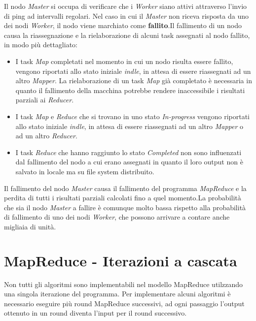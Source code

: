\documentclass[LaM,binding=0.6cm]{sapthesis}
\begin{document}
Il nodo \textit{Master} si occupa di verificare che i \textit{Worker} siano attivi attraverso l'invio di ping ad intervalli regolari.
Nel caso in cui il \textit{Master} non riceva risposta da uno dei nodi \textit{Worker}, il nodo viene marchiato come \textbf{fallito}.Il fallimento di un nodo causa la riassegnazione e la rielaborazione di alcuni task assegnati al nodo fallito, in modo più dettagliato:
\begin{itemize}
\item{I task \textit{Map} completati nel momento in cui un nodo risulta essere fallito, vengono riportati allo stato iniziale \textit{indle}, in attesa di essere riassegnati ad un altro \textit{Mapper}. La rielaborazione di un task \textit{Map} già completato è necessaria in quanto il fallimento della macchina potrebbe rendere inaccessibile i risultati parziali ai \textit{Reducer}.
}
\item{I task \textit{Map} e \textit{Reduce} che si trovano in uno stato \textit{In-progress} vengono riportati allo stato iniziale \textit{indle}, in attesa di essere riassegnati ad un altro \textit{Mapper} o ad un altro \textit{Reducer}.}
\item{I task \textit{Reduce} che hanno raggiunto lo stato \textit{Completed} non sono influenzati dal fallimento del nodo a cui erano assegnati in quanto il loro output non è salvato in locale ma su file system distribuito.}
\end{itemize}

Il fallimento del nodo \textit{Master} causa il fallimento del programma \textit{MapReduce} e la perdita di tutti i risultati parziali calcolati fino a quel momento.La probabilità che sia il nodo \textit{Master} a fallire è comunque molto bassa rispetto alla probabilità di fallimento di uno dei nodi \textit{Worker}, che possono arrivare a contare anche migliaia di unità.

\section{MapReduce - Iterazioni a cascata}

Non tutti gli algoritmi sono implementabili nel modello MapReduce \cite{Dean:2008:MSD:1327452.1327492} utilzzando una singola iterazione del programma. Per implementare alcuni algoritmi è necessario eseguire più round MapReduce successivi, ad ogni passaggio l'output ottenuto in un round diventa l'input per il round successivo.
\end{document}
